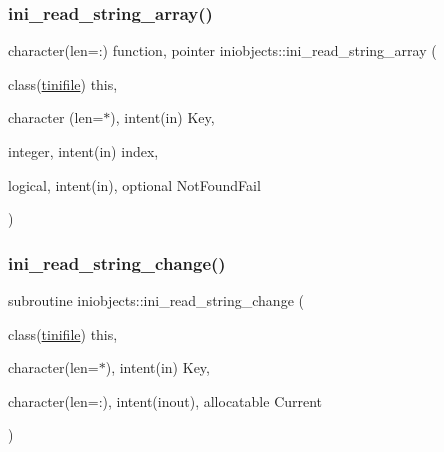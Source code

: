 \mbox{\label{namespaceiniobjects_ad97700ba84c737601d0ad383c27f1af4}} 
\subsubsection{\texorpdfstring{ini\+\_\+read\+\_\+string\+\_\+array()}{ini\_read\_string\_array()}}
{\footnotesize\ttfamily character(len=\+:) function, pointer iniobjects\+::ini\+\_\+read\+\_\+string\+\_\+array (\begin{DoxyParamCaption}\item[{class(\mbox{\hyperlink{structiniobjects_1_1tinifile}{tinifile}})}]{this,  }\item[{character (len=$\ast$), intent(in)}]{Key,  }\item[{integer, intent(in)}]{index,  }\item[{logical, intent(in), optional}]{Not\+Found\+Fail }\end{DoxyParamCaption})\hspace{0.3cm}{\ttfamily [private]}}

\mbox{\label{namespaceiniobjects_a6770561ba1885823e0a1d5d341cb7fa5}} 
\subsubsection{\texorpdfstring{ini\+\_\+read\+\_\+string\+\_\+change()}{ini\_read\_string\_change()}}
{\footnotesize\ttfamily subroutine iniobjects\+::ini\+\_\+read\+\_\+string\+\_\+change (\begin{DoxyParamCaption}\item[{class(\mbox{\hyperlink{structiniobjects_1_1tinifile}{tinifile}})}]{this,  }\item[{character(len=$\ast$), intent(in)}]{Key,  }\item[{character(len=\+:), intent(inout), allocatable}]{Current }\end{DoxyParamCaption})\hspace{0.3cm}{\ttfamily [private]}}



